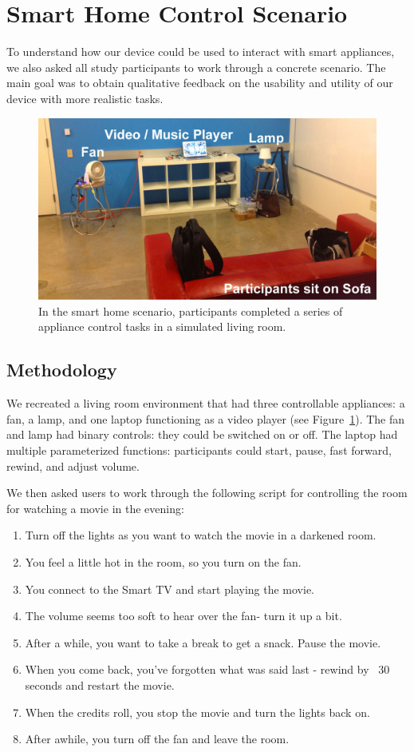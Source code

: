 \section{Smart Home Control Scenario}
To understand how our device could be used to interact with smart appliances, we also asked all study participants to work through a concrete scenario. The main goal was to obtain qualitative feedback on the usability and utility of our device with more realistic tasks.

\begin{figure}[t]
\centering
\includegraphics[width=1.0\columnwidth]{figures/smarthome-scenario.jpg}
\caption{In the smart home scenario, participants completed a series of appliance control tasks in a simulated living room.}
\label{fig:smarthome}
\end{figure}

\subsection{Methodology}
We recreated a living room environment that had three controllable appliances: a fan, a lamp, and one laptop functioning as a video player (see Figure~\ref{fig:smarthome}). The fan and lamp had binary controls: they could be switched on or off. The laptop had multiple parameterized functions: participants could start, pause, fast forward, rewind, and adjust volume.

We then asked users to work through the following script for controlling the room for watching a movie in the evening:
{\small
\begin{enumerate}
\item Turn off the lights as you want to watch the movie in a darkened room.
\item You feel a little hot in the room, so you turn on the fan.
\item You connect to the Smart TV and start playing the movie. 
\item The volume seems too soft to hear over the fan- turn it up a bit. 
\item After a while, you want to take a break to get a snack. Pause the movie. 
\item When you come back, you've forgotten what was said last - rewind by ~30 seconds and restart the movie. 
\item When the credits roll, you stop the movie and turn the lights back on.
\item After awhile, you turn off the fan and leave the room.
\end{enumerate}
}

